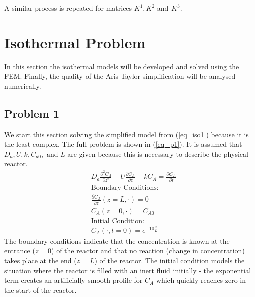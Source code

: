 \documentclass[11pt,fleqn]{article}
\theoremstyle{defstyle}
\begin{document}
A similar process is repeated for matrices $K^1, K^2$ and $K^3$. 

\section{Isothermal Problem}
In this section the isothermal models will be developed and solved using the FEM. Finally, the quality of the Aris-Taylor simplification will be analysed numerically.  
\subsection{Problem 1}
\label{section_isop1}
We start this section solving the simplified model from (\ref{eq_iso1}) because it is the least complex. The full problem is shown in (\ref{eq_p1}). It is assumed that $D_a, U, k, C_{a0},\text{ and } L$ are given because this is necessary to describe the physical reactor.  
\begin{equation}
\begin{aligned}
&D_a \frac{\partial^2 C_A}{\partial z^2} - U \frac{\partial C_A}{\partial z} - kC_A = 
\frac{\partial C_A}{\partial t} \\
&\text{Boundary Conditions:} \\
&\frac{\partial C_A}{\partial z}(z=L, \cdot) = 0\\
&C_A(z=0, \cdot) = C_{A0} \\
&\text{Initial Condition:} \\
& C_A(\cdot, t= 0) = e^{-10\frac{z}{L}}
\end{aligned}
\label{eq_p1}
\end{equation}
The boundary conditions indicate that the concentration is known at the entrance ($z=0$) of the reactor and that no reaction (change in concentration) takes place at the end ($z=L$) of the reactor. The initial condition models the situation where the reactor is filled with an inert fluid initially - the exponential term creates an artificially smooth profile for $C_{A}$ which quickly reaches zero in the start of the reactor. 
\end{document}
